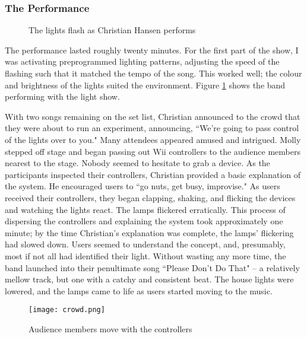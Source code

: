 \subsubsection{The Performance}

\begin{figure}
	\centering

	\hspace{0.1cm}

	\caption{The lights flash as Christian Hansen performs}

	\label{prototyping3.10}
\end{figure}

The performance lasted roughly twenty minutes. For the first part of the show, I was activating preprogrammed lighting patterns, adjusting the speed of the flashing such that it matched the tempo of the song. This worked well; the colour and brightness of the lights suited the environment. Figure \ref{prototyping3.10} shows the band performing with the light show.

With two songs remaining on the set list, Christian announced to the crowd that they were about to run an experiment, announcing, ``We're going to pass control of the lights over to you." Many attendees appeared amused and intrigued. Molly stepped off stage and began passing out Wii controllers to the audience members nearest to the stage. Nobody seemed to hesitate to grab a device. As the participants inspected their controllers, Christian provided a basic explanation of the system. He encouraged users to ``go nuts, get busy, improvise." As users received their controllers, they began clapping, shaking, and flicking the devices and watching the lights react. The lamps flickered erratically. This process of dispersing the controllers and explaining the system took approximately one minute; by the time Christian's explanation was complete, the lamps' flickering had slowed down. Users seemed to understand the concept, and, presumably, most if not all had identified their light. Without wasting any more time, the band launched into their penultimate song ``Please Don't Do That" -- a relatively mellow track, but one with a catchy and consistent beat. The house lights were lowered, and the lamps came to life as users started moving to the music.

\begin{figure}
	\centering

	\texttt{[image: crowd.png]}
	\caption{Audience members move with the controllers}

	\label{prototyping3.11}
\end{figure}

